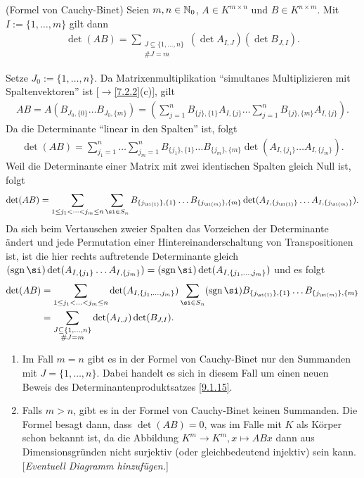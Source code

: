 \documentclass[../../main.tex]{subfiles}
\begin{document}
\begin{sat}\label{17.2.5}
(Formel von Cauchy-Binet) Seien $m,n\in \mathbb N_0$, $A\in K^{m\times n}$ und $B\in K^{n\times m}$. Mit $I:=\{1,\ldots ,m\}$ gilt dann 
\begin{align*}
\det(AB)=\sum_{\substack{J\subseteq\{1,\ldots ,n\}\\\#J=m}}(\det A_{I,J})(\det B_{J,I}).
\end{align*}
\end{sat}
\begin{cproof}
Setze $J_0:=\{1,\ldots ,n\}$. Da Matrixenmultiplikation \enquote{simultanes Multiplizieren mit Spaltenvektoren} ist [$\to$\ref{7.2.2}(c)], gilt
\begin{align*}
AB=A(B_{J_0,\{0\}}\hdots B_{J_0,\{m\}})=\left(\sum_{j=1}^nB_{\{j\},\{1\}}A_{I,\{j\}}\hdots\sum_{j=1}^nB_{\{j\},\{m\}}A_{I,\{j\}}\right).
\end{align*}
Da die Determinante \enquote{linear in den Spalten} ist, folgt
\begin{align*}
\det(AB)=\sum_{j_1=1}^n\hdots\sum_{j_m=1}^n B_{\{j_1\},\{1\}}\hdots B_{\{j_m\},\{m\}}\det(A_{I,\{j_1\}}\hdots A_{I,\{j_m\}}).
\end{align*}
Weil die Determinante einer Matrix mit zwei identischen Spalten gleich Null ist, folgt
\begin{align*}
\det(AB)=\sum_{1\le j_1<\cdots <j_m\le n}\sum_{\si\in S_n}B_{\{j_{\si(1)}\},\{1\}}\hdots B_{\{j_{\si(m)}\},\{m\}}\det(A_{I,\{j_{\si(1)}\}}\hdots A_{I,\{j_{\si(m)}\}}).
\end{align*}
Da sich beim Vertauschen zweier Spalten das Vorzeichen der Determinante ändert und jede Permutation einer Hintereinanderschaltung von Transpositionen ist, ist die hier rechts auftretende Determinante gleich $(\sgn\si)\det(A_{I,\{j_1\}}\hdots A_{I,\{j_m\}})=(\sgn\si)\det(A_{I,\{j_1,\ldots ,j_m\}})$ und es folgt
\begin{align*}
\det(AB)&=\sum_{1\le j_1<\ldots <j_m\le n}\det(A_{I,\{j_1,\ldots ,j_m\}})\sum_{\si\in S_n}(\sgn\si)B_{\{j_{\si(1)}\},\{1\}}\hdots B_{\{j_{\si(m)}\},\{m\}}\\
&=\sum_{\substack{J\subseteq\{1,\ldots ,n\}\\\#J=m}}\det(A_{I,J})\det(B_{J,I}).
\end{align*}
\end{cproof}

\begin{bem}\label{17.2.6}
\begin{enumerate}[\normalfont(a)]
\item Im Fall $m=n$ gibt es in der Formel von Cauchy-Binet nur den Summanden mit $J=\{1,\ldots,n\}$. Dabei handelt es sich in diesem Fall um einen neuen Beweis des Determinantenproduktsatzes \ref{9.1.15}.

\item Falls $m>n$, gibt es in der Formel von Cauchy-Binet keinen Summanden. Die Formel besagt dann, dass $\det(AB)=0$, was im Falle mit $K$ als Körper schon bekannt ist, da die Abbildung $K^m\to K^m, x\mapsto ABx$ dann aus Dimensionsgründen nicht surjektiv (oder gleichbedeutend injektiv) sein kann. [\textit{Eventuell Diagramm hinzufügen.}]
\end{enumerate}
\end{bem}
\end{document}
